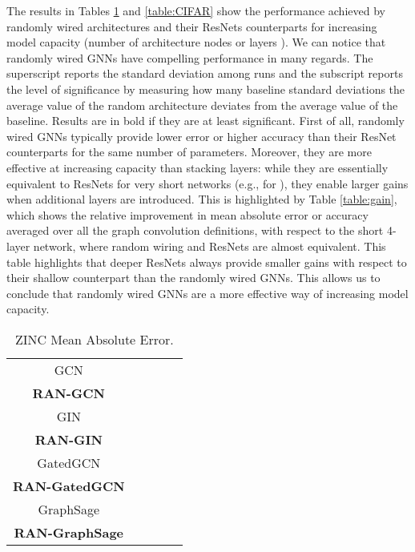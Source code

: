 \documentclass[10pt,twocolumn,twoside]{IEEEtran}
\begin{document}
The results in Tables \ref{table:ZINC} and \ref{table:CIFAR} show the performance achieved by randomly wired architectures and their ResNets counterparts for increasing model capacity (number of architecture nodes or layers ). We can notice that randomly wired GNNs have compelling performance in many regards. The superscript reports the standard deviation among runs and the subscript reports the level of significance by measuring how many baseline standard deviations the average value of the random architecture deviates from the average value of the baseline. Results are in bold if they are at least  significant. First of all, randomly wired GNNs typically provide lower error or higher accuracy than their ResNet counterparts for the same number of parameters. Moreover, they are more effective at increasing capacity than stacking layers: while they are essentially equivalent to ResNets for very short networks (e.g., for ), they enable larger gains when additional layers are introduced. This is highlighted by Table \ref{table:gain}, which shows the relative improvement in mean absolute error or accuracy averaged over all the graph convolution definitions, with respect to the short 4-layer network, where random wiring and ResNets are almost equivalent. This table highlights that deeper ResNets always provide smaller gains with respect to their shallow counterpart than the randomly wired GNNs. This allows us to conclude that randomly wired GNNs are a more effective way of increasing model capacity.


\begin{table}
\caption{ZINC Mean Absolute Error.} \label{table:ZINC}
\setlength\tabcolsep{1.5pt} 
\renewcommand{\arraystretch}{1.5}
\centering
\begin{tabular}{ccccc}
     &  &  &  &  \\ \hline
GCN &  &  &  &  \\
\textbf{RAN-GCN} &  &  &  & \\ \hline
GIN &  &  &  & \\
\textbf{RAN-GIN} &  &  &  &  \\ \hline
GatedGCN &  &  &  & \\
\textbf{RAN-GatedGCN} &  &  &  &  \\ \hline
GraphSage &  &  &  & \\
\textbf{RAN-GraphSage} &  &  &  &  \\ \hline
\end{tabular}
\end{table}
\end{document}
